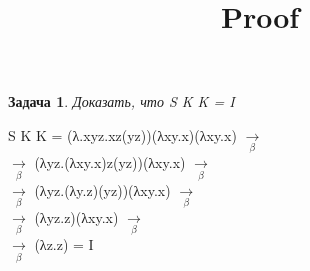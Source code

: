 \documentclass{article}
\date{}
\title{Proof}
\newtheorem{problem}{Задача}
\begin{document}
\maketitle
\begin{problem}
Доказать, что S K K = I
\end{problem}

\Large
\noindent
S K K = (λ.xyz.xz(yz))(λxy.x)(λxy.x) $\underset{\beta}{\longrightarrow}$ \\
$\underset{\beta}{\longrightarrow}$ (λyz.(λxy.x)z(yz))(λxy.x) $\underset{\beta}{\longrightarrow}$ \\
$\underset{\beta}{\longrightarrow}$ (λyz.(λy.z)(yz))(λxy.x) $\underset{\beta}{\longrightarrow}$ \\
$\underset{\beta}{\longrightarrow}$ (λyz.z)(λxy.x) $\underset{\beta}{\longrightarrow}$ \\
$\underset{\beta}{\longrightarrow}$ (λz.z) = I
\end{document}
